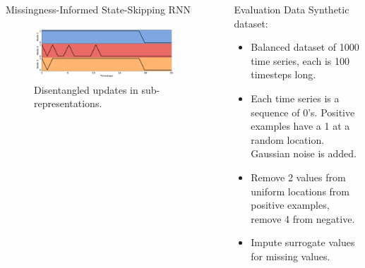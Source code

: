 \documentclass[final, 18pt]{beamer}
\newlength{\sepwid}
\newlength{\onecolwid}
\begin{document}
\begin{frame}
\begin{columns}[t]
\begin{column}{\onecolwid}
\begin{alertblock}{\centering Missingness-Informed State-Skipping RNN}
\begin{figure}
    \centering
    \includegraphics[width=.8\onecolwid]{img/example_skipping.pdf}
    \caption{Disentangled updates in sub-representations.}
\end{figure}

\end{alertblock}

\end{column} %

\begin{column}{\sepwid}\end{column}

\begin{column}{\onecolwid}

\begin{alertblock}{\centering Evaluation Data}
Synthetic dataset:
\begin{itemize}
    \item Balanced dataset of 1000 time series, each is 100 timesteps long.
    \item Each time series is a sequence of 0's. Positive examples have a 1 at a random location. Gaussian noise is added.
    \item Remove 2 values from uniform locations from positive examples, remove 4 from negative.
    \item Impute surrogate values for missing values.
\end{itemize}
\end{alertblock}



\end{column}
\end{columns}
\end{frame}
\end{document}
